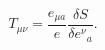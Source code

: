 \begin{equation}\label{eq:defemt}
  T_{\mu\nu}=\frac{e_{\mu a}}{e}\frac{\delta S}
  {\delta e^\nu{}_a}.
\end{equation}

